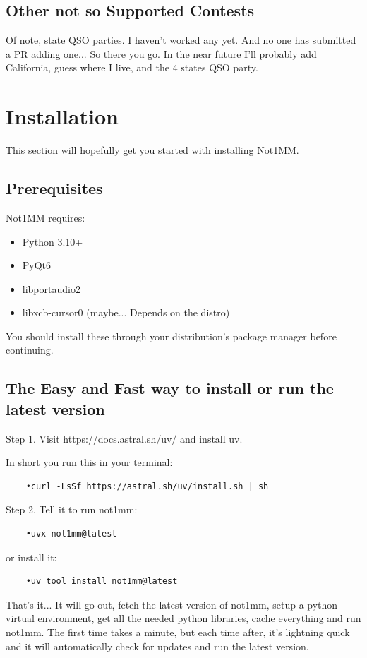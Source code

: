 \documentclass{article}
\begin{document}
\subsection{Other not so Supported Contests}
Of note, state QSO parties. I haven't worked any yet. And no one has submitted a PR adding one... So there you go. In the near future I'll probably add California, guess where I live, and the 4 states QSO party.
\newpage
\section{Installation}
This section will hopefully get you started with installing Not1MM.
\subsection{Prerequisites}
Not1MM requires:
\begin{itemize}
    \item Python 3.10+
    \item PyQt6
    \item libportaudio2
    \item libxcb-cursor0 (maybe... Depends on the distro)
\end{itemize}
You should install these through your distribution's package manager before continuing.
\subsection{The Easy and Fast way to install or run the latest version}

Step 1. Visit https://docs.astral.sh/uv/ and install uv.

In short you run this in your terminal:
\begin{verbatim}
    •curl -LsSf https://astral.sh/uv/install.sh | sh
\end{verbatim}
Step 2. Tell it to run not1mm:
\begin{verbatim}
    •uvx not1mm@latest
\end{verbatim}
or install it:
\begin{verbatim}
    •uv tool install not1mm@latest
\end{verbatim}

That's it... It will go out, fetch the latest version of not1mm, setup a python virtual environment, get all the needed python libraries, cache everything and run not1mm. The first time takes a minute, but each time after, it's lightning quick and it will automatically check for updates and run the latest version.
\end{document}
